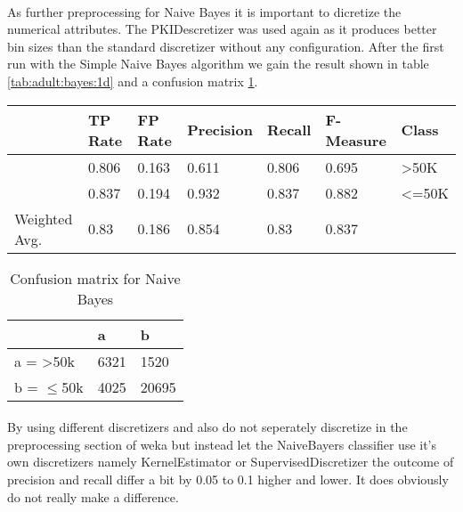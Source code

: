 \documentclass[paper=a4, fontsize=11pt]{scrartcl} %
\numberwithin{equation}{section} %
\numberwithin{figure}{section} %
\numberwithin{table}{section} %
\begin{document}
\paragraph{}As further preprocessing for Naive Bayes it is important to dicretize the numerical attributes. The PKIDescretizer was used again as it produces better bin sizes than the standard discretizer without any configuration. After the first run with the Simple Naive Bayes algorithm we gain the result shown in table \ref{tab:adult:bayes:1d} and a confusion matrix \ref{tab:adult:bayes:1c}.


\begin{table*}[htb]\centering
  \begin{tabular*}{\columnwidth}{@{}lllllll@{}}
      \toprule 
               &  TP Rate & FP Rate & Precision & Recall & F-Measure & Class \\   \midrule
               &  0.806   & 0.163   & 0.611     & 0.806  & 0.695     & >50K  \\
               &  0.837   & 0.194   & 0.932     & 0.837  & 0.882     & <=50K \\
Weighted Avg.  &  0.83    & 0.186   & 0.854     & 0.83   & 0.837     &       \\   \bottomrule
    \end{tabular*}
\caption{Naive Bayes -- preprocessed with PKIDiscretizer} 
\label{tab:adult:bayes:1d}
\end{table*}



\begin{table}[h]
\centering
\begin{tabular}{|l|ll|}
\hline
              &    a &     b \\
\hline
 a = >50k      & 6321 &1520   \\
 b = $\leq$50k & 4025 &20695 \\
\hline
\end{tabular}
\caption{Confusion matrix for Naive Bayes}
\label{tab:adult:bayes:1c}
\end{table}

\paragraph{}By using different discretizers and also do not seperately discretize in the preprocessing section of weka but instead let the NaiveBayers classifier use it's own discretizers namely KernelEstimator or SupervisedDiscretizer the outcome of precision and recall differ a bit by 0.05 to 0.1 higher and lower. It does obviously do not really make a difference.
\end{document}

